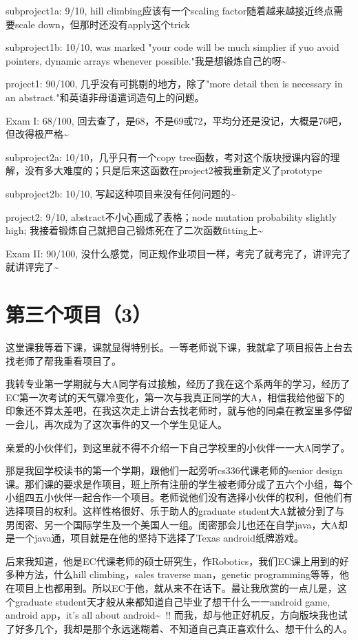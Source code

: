 \documentclass[12pt]{book}
\begin{document}
subproject1a: 9/10, hill climbing应该有一个scaling factor随着越来越接近终点需要scale down，但那时还没有apply这个trick

subproject1b: 10/10, was marked "your code will be much simplier if yuo avoid pointers, dynamic arrays whenever possible."我是想锻炼自己的呀\textasciitilde{}~

project1:     90/100, 几乎没有可挑剔的地方，除了"more detail then is necessary in an abstract."和英语非母语遣词造句上的问题。

Exam I:       68/100, 回去查了，是68，不是69或72，平均分还是没记，大概是76吧，但改得极严格\textasciitilde{}~

subproject2a: 10/10，几乎只有一个copy tree函数，考对这个版块授课内容的理解，没有多大难度的；只是后来这函数在project2被我重新定义了prototype

subproject2b: 10/10, 写起这种项目来没有任何问题的\textasciitilde{}~

project2:     9/10, abstract不小心画成了表格；node mutation probability slightly high; 我接着锻炼自己就把自己锻炼死在了二次函数fitting上\textasciitilde{}~

Exam II:      90/100, 没什么感觉，同正规作业项目一样，考完了就考完了，讲评完了就讲评完了\textasciitilde{}~

\section{第三个项目（3）}
\label{sec-32-3}

这堂课我等着下课，课就显得特别长。一等老师说下课，我就拿了项目报告上台去找老师了帮我重看项目了。

我转专业第一学期就与大A同学有过接触，经历了我在这个系两年的学习，经历了EC第一次考试的天气骤冷变化，第一次与我真正同学的大A，相信我给他留下的印象还不算太差吧，在我这次走上讲台去找老师时，就与他的同桌在教室里多停留一会儿，再次成为了这次事件的又一个学生见证人。

亲爱的小伙伴们，到这里就不得不介绍一下自己学校里的小伙伴一一大A同学了。

那是我回学校读书的第一个学期，跟他们一起旁听cs336代课老师的senior design课。那们课的要求是作项目，班上所有注册的学生被老师分成了五六个小组，每个小组四五小伙伴一起合作一个项目。老师说他们没有选择小伙伴的权利，但他们有选择项目的权利。这样性格很好、乐于助人的graduate student大A就被分到了与男闺密、另一个国际学生及一个美国人一组。闺密那会儿也还在自学java，大A却是一个java通，项目就是在他的坚持下选择了Texas android纸牌游戏。

后来我知道，他是EC代课老师的硕士研究生，作Robotics，我们EC课上用到的好多种方法，什么hill climbing，sales traverse man，genetic programming等等，他在项目上也都用到。所以EC于他，就从来不在话下。最让我欣赏的一点儿是，这个graduate student天才般从来都知道自己毕业了想干什么一一android game, android app，it's all about android\textasciitilde{}~!! 而我，却与他正好机反，方向版块我也试了好多几个，我却是那个永远迷糊着、不知道自己真正喜欢什么、想干什么的人。
\end{document}
